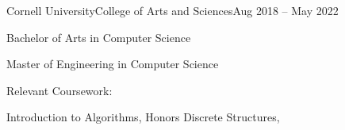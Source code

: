 \documentclass{resume}
\begin{document}
\begin{education}
    \begin{entryleft}{Cornell University}{College of Arts and Sciences}{Aug 2018 -- May 2022}

        \begin{description}
            \item Bachelor of Arts in Computer Science
            \item Master of Engineering in Computer Science
            \item Relevant Coursework: \\
                \begin{spacing}{0.2}
                Introduction to Algorithms, Honors Discrete Structures, \\

\end{spacing}
\end{description}
\end{entryleft}
\end{education}
\end{document}
